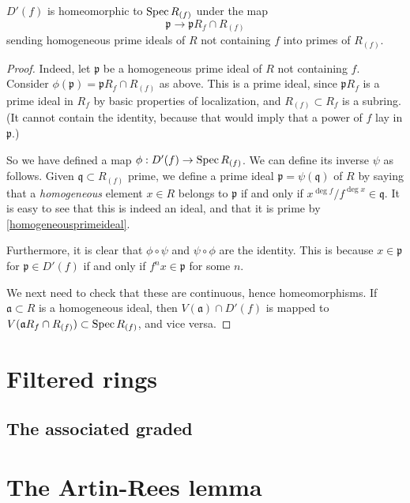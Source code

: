 \begin{proposition} 
$D'(f)$ is homeomorphic to $\operatorname{Spec} R_{(f)}$ under the map
\[  \mathfrak{p}  \to \mathfrak{p} R_f \cap R_{(f)}  \]
sending homogeneous prime ideals of $R$ not containing $f$ into primes of
$R_{(f)}$.
\end{proposition} 
\begin{proof} 
Indeed, let $\mathfrak{p}$ be a homogeneous prime ideal of $R$ not containing
$f$. Consider $\phi(\mathfrak{p}) = \mathfrak{p} R_f \cap R_{(f)} $ as above.
This is a prime ideal, since $\mathfrak{p}  R_f$ is a prime ideal in $R_f$ by
basic properties of localization, and $R_{(f)} \subset R_f$ is a subring. (It
cannot contain the identity, because that would imply that a power of $f$ lay
in $\mathfrak{p}$.)

So we have defined a map $\phi: D'(f) \to \operatorname{Spec} R_{(f)}$.  We can define its
inverse $\psi$ as follows. Given $\mathfrak{q} \subset R_{(f)} $ prime, we define a
prime ideal $\mathfrak{p} = \psi(\mathfrak{q})$ of $R$ by saying that a \textit{homogeneous} element $x \in
R$ belongs to $\mathfrak{p}$ if and only if $x^{\deg f}/f^{\deg x} \in
\mathfrak{q}$. It is easy to see that this is indeed an ideal, and that it is
prime by \cref{homogeneousprimeideal}.

Furthermore, it is clear that $\phi \circ \psi $ and $\psi \circ \phi$ are the identity.
This is because $x \in \mathfrak{p}$ for $\mathfrak{p} \in D'(f)$ if and only
if $f^n x \in \mathfrak{p}$ for some $n$.

We next need to check that these are continuous, hence homeomorphisms.  If
$\mathfrak{a} \subset R$ is a homogeneous ideal, then $V(\mathfrak{a}) \cap
D'(f)$ is
mapped to $V(\mathfrak{a}R_f \cap R_{(f)}) \subset \operatorname{Spec} R_{(f)}$, and vice
versa.
\end{proof} 

\section{Filtered rings}

\subsection{The associated graded}

\section{The Artin-Rees lemma}
